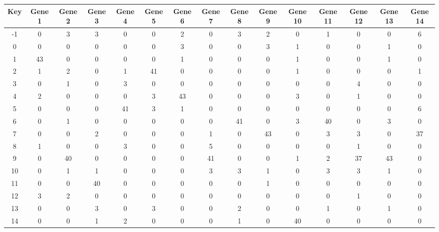 \begin{tabular}{|c|c|c|c|c|c|c|c|c|c|c|c|c|c|c|}
\hline
Key & Gene 1 & Gene 2 & Gene 3 & Gene 4 & Gene 5 & Gene 6 & Gene 7 & Gene 8 & Gene 9 & Gene 10 & Gene 11 & Gene 12 & Gene 13 & Gene 14 \\
\hline
-1 & 0 & 3 & 3 & 0 & 0 & 2 & 0 & 3 & 2 & 0 & 1 & 0 & 0 & 6 \\
0 & 0 & 0 & 0 & 0 & 0 & 3 & 0 & 0 & 3 & 1 & 0 & 0 & 1 & 0 \\
1 & 43 & 0 & 0 & 0 & 0 & 1 & 0 & 0 & 0 & 1 & 0 & 0 & 1 & 0 \\
2 & 1 & 2 & 0 & 1 & 41 & 0 & 0 & 0 & 0 & 1 & 0 & 0 & 0 & 1 \\
3 & 0 & 1 & 0 & 3 & 0 & 0 & 0 & 0 & 0 & 0 & 0 & 4 & 0 & 0 \\
4 & 2 & 0 & 0 & 0 & 3 & 43 & 0 & 0 & 0 & 3 & 0 & 1 & 0 & 0 \\
5 & 0 & 0 & 0 & 41 & 3 & 1 & 0 & 0 & 0 & 0 & 0 & 0 & 0 & 6 \\
6 & 0 & 1 & 0 & 0 & 0 & 0 & 0 & 41 & 0 & 3 & 40 & 0 & 3 & 0 \\
7 & 0 & 0 & 2 & 0 & 0 & 0 & 1 & 0 & 43 & 0 & 3 & 3 & 0 & 37 \\
8 & 1 & 0 & 0 & 3 & 0 & 0 & 5 & 0 & 0 & 0 & 0 & 1 & 0 & 0 \\
9 & 0 & 40 & 0 & 0 & 0 & 0 & 41 & 0 & 0 & 1 & 2 & 37 & 43 & 0 \\
10 & 0 & 1 & 1 & 0 & 0 & 0 & 3 & 3 & 1 & 0 & 3 & 3 & 1 & 0 \\
11 & 0 & 0 & 40 & 0 & 0 & 0 & 0 & 0 & 1 & 0 & 0 & 0 & 0 & 0 \\
12 & 3 & 2 & 0 & 0 & 0 & 0 & 0 & 0 & 0 & 0 & 0 & 1 & 0 & 0 \\
13 & 0 & 0 & 3 & 0 & 3 & 0 & 0 & 2 & 0 & 0 & 1 & 0 & 1 & 0 \\
14 & 0 & 0 & 1 & 2 & 0 & 0 & 0 & 1 & 0 & 40 & 0 & 0 & 0 & 0 \\
\hline
\end{tabular}